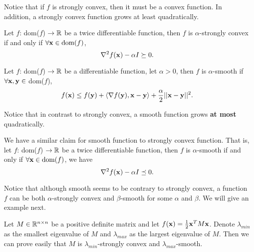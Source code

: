 \documentclass[../main.tex]{subfiles}
\begin{document}
Notice that if $f$ is strongly convex, then it must be a convex function. In addition, a strongly convex function grows at least quadratically. 

\begin{claim}\label{strongly-convex-lemma}
	Let $f$: dom($f$) $\to \mathbb{R}$ be a twice differentiable function, then $f$ is $\alpha$-strongly convex if and only if  $\forall \mathbf{x} \in \textmd{dom}(f)$,
		\begin{equation*}
			\nabla^2 f(\mathbf{x}) - \alpha I \succeq 0.
		\end{equation*}
\end{claim}

\begin{definition}
	Let $f$: dom($f$) $\to \mathbb{R}$ be a differentiable function, let $\alpha >0$, then $f$ is $\alpha$-smooth if $\forall \mathbf{x}, \mathbf{y} \in $ dom($f$), 
	\begin{equation*}
		f(\mathbf{x}) \leq f(\mathbf{y}) + \langle \nabla f(\mathbf{y}), \mathbf{x} - \mathbf{y} \rangle + \frac{\alpha}{2} ||\mathbf{x} - \mathbf{y}||^2.
	\end{equation*}
\end{definition}

Notice that in contrast to strongly convex, a smooth function grows \textbf{at most} quadratically.

\begin{claim}\label{smooth-lemma}
	We have a similar claim for smooth function to strongly convex function. That is, let $f$: dom($f$) $\to \mathbb{R}$ be a twice differentiable function, then $f$ is $\alpha$-smooth if and only if $\forall \mathbf{x} \in \textmd{dom}(f)$, we have
	\begin{equation*}
		\nabla^2 f(\mathbf{x}) - \alpha I \preceq 0.
	\end{equation*}
\end{claim}

Notice that although smooth seems to be contrary to strongly convex, a function $f$ can be both $\alpha$-strongly convex and $\beta$-smooth for some $\alpha$ and $\beta$. We will give an example next.

\begin{example}
	Let $M \in \mathbb{R}^{n\times n}$ be a positive definite matrix and let $f(\mathbf{x}) = \frac{1}{2} \mathbf{x}^T M \mathbf{x}$. Denote $\lambda_{min}$ as the smallest eigenvalue of $M$ and $\lambda_{max}$ as the largest eigenvalue of $M$. Then we can prove easily that $M$ is $\lambda_{min}$-strongly convex and $\lambda_{max}$-smooth.
\end{example}
\end{document}
